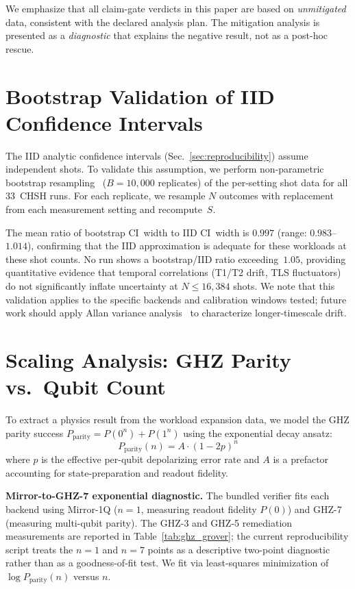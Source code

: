 \documentclass[aps,prxquantum,twocolumn,superscriptaddress,amsmath,amssymb,longbibliography,floatfix]{revtex4-2}
\begin{document}
We emphasize that all claim-gate verdicts in this paper are based on \emph{unmitigated} data, consistent with the declared analysis plan. The mitigation analysis is presented as a \emph{diagnostic} that explains the negative result, not as a post-hoc rescue.

\section{Bootstrap Validation of IID Confidence Intervals}
\label{sec:bootstrap}

The IID analytic confidence intervals (Sec.~\ref{sec:reproducibility}) assume independent shots. To validate this assumption, we perform non-parametric bootstrap resampling~\cite{Efron1979} ($B = 10{,}000$ replicates) of the per-setting shot data for all 33~CHSH runs. For each replicate, we resample $N$ outcomes with replacement from each measurement setting and recompute~$S$.

The mean ratio of bootstrap CI~width to IID CI~width is $0.997$ (range: $0.983$--$1.014$), confirming that the IID approximation is adequate for these workloads at these shot counts. No run shows a bootstrap/IID ratio exceeding~$1.05$, providing quantitative evidence that temporal correlations (T1/T2 drift, TLS fluctuators) do not significantly inflate uncertainty at $N \leq 16{,}384$ shots. We note that this validation applies to the specific backends and calibration windows tested; future work should apply Allan variance analysis~\cite{Sarovar2020} to characterize longer-timescale drift.

\section{Scaling Analysis: GHZ Parity vs.\ Qubit Count}
\label{sec:scaling}

To extract a physics result from the workload expansion data, we model the GHZ parity success $P_{\text{parity}} = P(0^n) + P(1^n)$ using the exponential decay ansatz:
\begin{equation}
  P_{\text{parity}}(n) = A \cdot (1 - 2p)^n
  \label{eq:ghzscaling}
\end{equation}
where $p$ is the effective per-qubit depolarizing error rate and $A$ is a prefactor accounting for state-preparation and readout fidelity.

\textbf{Mirror-to-GHZ-7 exponential diagnostic.} The bundled verifier fits each backend using Mirror-1Q ($n{=}1$, measuring readout fidelity $P(0)$) and GHZ-7 (measuring multi-qubit parity). The GHZ-3 and GHZ-5 remediation measurements are reported in Table~\ref{tab:ghz_grover}; the current reproducibility script treats the $n{=}1$ and $n{=}7$ points as a descriptive two-point diagnostic rather than as a goodness-of-fit test. We fit via least-squares minimization of $\log P_{\text{parity}}(n)$ versus $n$.
\end{document}
